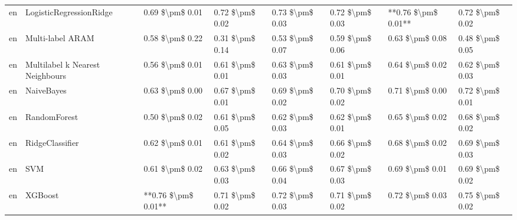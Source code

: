 \begin{tabular}{llllllll}
      en &         LogisticRegressionRidge &     0.69 \$\textbackslash pm\$ 0.01 &           0.72 \$\textbackslash pm\$ 0.02 &       0.73 \$\textbackslash pm\$ 0.03 &        0.72 \$\textbackslash pm\$ 0.03 &                     **0.76 \$\textbackslash pm\$ 0.01** &     0.72 \$\textbackslash pm\$ 0.02 \\
      en &                Multi-label ARAM &     0.58 \$\textbackslash pm\$ 0.22 &           0.31 \$\textbackslash pm\$ 0.14 &       0.53 \$\textbackslash pm\$ 0.07 &        0.59 \$\textbackslash pm\$ 0.06 &                         0.63 \$\textbackslash pm\$ 0.08 &     0.48 \$\textbackslash pm\$ 0.05 \\
      en & Multilabel k Nearest Neighbours &     0.56 \$\textbackslash pm\$ 0.01 &           0.61 \$\textbackslash pm\$ 0.01 &       0.63 \$\textbackslash pm\$ 0.03 &        0.61 \$\textbackslash pm\$ 0.01 &                         0.64 \$\textbackslash pm\$ 0.02 &     0.62 \$\textbackslash pm\$ 0.03 \\
      en &                      NaiveBayes &     0.63 \$\textbackslash pm\$ 0.00 &           0.67 \$\textbackslash pm\$ 0.01 &       0.69 \$\textbackslash pm\$ 0.02 &        0.70 \$\textbackslash pm\$ 0.02 &                         0.71 \$\textbackslash pm\$ 0.00 &     0.72 \$\textbackslash pm\$ 0.01 \\
      en &                    RandomForest &     0.50 \$\textbackslash pm\$ 0.02 &           0.61 \$\textbackslash pm\$ 0.05 &       0.62 \$\textbackslash pm\$ 0.03 &        0.62 \$\textbackslash pm\$ 0.01 &                         0.65 \$\textbackslash pm\$ 0.02 &     0.68 \$\textbackslash pm\$ 0.02 \\
      en &                 RidgeClassifier &     0.62 \$\textbackslash pm\$ 0.01 &           0.61 \$\textbackslash pm\$ 0.02 &       0.64 \$\textbackslash pm\$ 0.03 &        0.66 \$\textbackslash pm\$ 0.02 &                         0.68 \$\textbackslash pm\$ 0.02 &     0.69 \$\textbackslash pm\$ 0.03 \\
      en &                             SVM &     0.61 \$\textbackslash pm\$ 0.02 &           0.63 \$\textbackslash pm\$ 0.03 &       0.66 \$\textbackslash pm\$ 0.04 &        0.67 \$\textbackslash pm\$ 0.03 &                         0.69 \$\textbackslash pm\$ 0.01 &     0.69 \$\textbackslash pm\$ 0.02 \\
      en &                         XGBoost & **0.76 \$\textbackslash pm\$ 0.01** &           0.71 \$\textbackslash pm\$ 0.02 &       0.72 \$\textbackslash pm\$ 0.03 &        0.71 \$\textbackslash pm\$ 0.02 &                         0.72 \$\textbackslash pm\$ 0.03 &     0.75 \$\textbackslash pm\$ 0.02 \\

\end{tabular}

